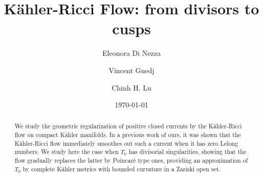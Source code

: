 \documentclass[11pt]{amsart}
\numberwithin{equation}{section}
\begin{document}
\title{K\"ahler-Ricci Flow: from divisors to cusps}


\date{\today}


 


\author{Eleonora Di Nezza}


\address{Universit\`a di Roma TorVergata, Dipartimento di Matematica Via della Ricerca Scientifica 1, 00133 Roma, Italy.} 
 
 

\author{Vincent Guedj}
\address{Institut Universitaire de France \& Institut de Mathématiques de Toulouse\\
  Université de Toulouse; CNRS, UPS\\
  118 route de Narbonne, F-31400 Toulouse\\
  France}


\author{Chinh H. Lu}
\address{Institut Universitaire de France \& Université d'Angers, CNRS, LAREMA, SFR MATHSTIC, F-49000 Angers, France}








 \begin{abstract}
We study the geometric regularization of positive closed currents by the K\"ahler-Ricci flow
on compact K\"ahler manifolds. In a previous work of ours, it was shown that the K\"ahler-Ricci flow 
immediately smoothes out such a current when it has zero Lelong numbers. 
We study here the case when $T_0$ has divisorial singularities, showing that the 
flow gradually replaces the latter by Poincaré type ones, providing 
an approximation of $T_0$ by complete K\"ahler metrics with bounded curvature in a Zariski open set.
 \end{abstract}




\maketitle
\end{document}
